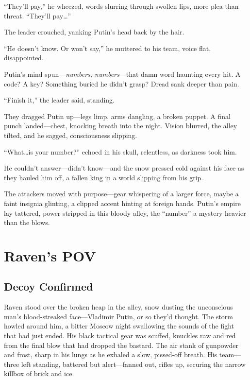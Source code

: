\documentclass[12pt]{book}
\begin{document}
\enquote{They’ll pay,} he wheezed, words slurring through swollen lips, more plea than threat. \enquote{They’ll pay\ldots}

The leader crouched, yanking Putin’s head back by the hair.

\enquote{He doesn’t know. Or won’t say,} he muttered to his team, voice flat, disappointed.

Putin’s mind spun---\textit{numbers, numbers}---that damn word haunting every hit. A code? A key? Something buried he didn’t grasp? Dread sank deeper than pain.

\enquote{Finish it,} the leader said, standing.

They dragged Putin up---legs limp, arms dangling, a broken puppet. A final punch landed---chest, knocking breath into the night. Vision blurred, the alley tilted, and he sagged, consciousness slipping.

\enquote{What\ldots is your number?} echoed in his skull, relentless, as darkness took him.

He couldn’t answer---didn’t know---and the snow pressed cold against his face as they hauled him off, a fallen king in a world slipping from his grip.

The attackers moved with purpose---gear whispering of a larger force, maybe a faint insignia glinting, a clipped accent hinting at foreign hands. Putin’s empire lay tattered, power stripped in this bloody alley, the \enquote{number} a mystery heavier than the blows.

\chapter{Raven’s POV}

\section{Decoy Confirmed}

Raven stood over the broken heap in the alley, snow dusting the unconscious man’s blood-streaked face—Vladimir Putin, or so they’d thought. The storm howled around him, a bitter Moscow night swallowing the sounds of the fight that had just ended. His black tactical gear was scuffed, knuckles raw and red from the final blow that had dropped the bastard. The air stank of gunpowder and frost, sharp in his lungs as he exhaled a slow, pissed-off breath. His team—three left standing, battered but alert—fanned out, rifles up, securing the narrow killbox of brick and ice.
\end{document}
